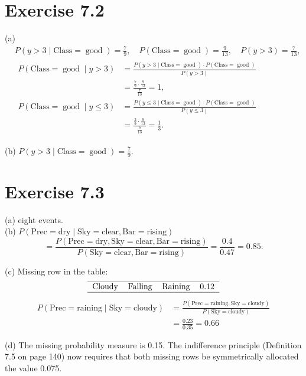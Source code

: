 \documentclass[10pt]{book}
\begin{document}
\section{Exercise 7.2}
(a)
\[
\begin{aligned}
& P(y>3 \mid \text{Class}=\operatorname{good})=\frac{7}{9}, \quad P(\text{Class}=\operatorname{good})=\frac{9}{13}, \quad P(y>3)=\frac{7}{13}, \\
& \begin{aligned}
P(\text{Class}=\operatorname{good} \mid y>3) & =\frac{P(y>3 \mid \text{Class}=\operatorname{good}) \cdot P(\text{Class}=\operatorname{good})}{P(y>3)} \\
& =\frac{\frac{7}{9} \cdot \frac{9}{13}}{\frac{7}{13}}=1, \\
P(\text{Class}=\operatorname{good} \mid y \leq 3) & =\frac{P(y \leq 3 \mid \text{Class}=\operatorname{good}) \cdot P(\text{Class}=\operatorname{good})}{P(y \leq 3)} \\
& =\frac{\frac{2}{9} \cdot \frac{9}{13}}{\frac{6}{13}}=\frac{1}{3}.
\end{aligned}
\end{aligned}
\]

(b) $P(y>3 \mid \text{Class}=\operatorname{good})=\frac{7}{9}$.

\section{Exercise 7.3}
(a) eight events.\\
(b) $P(\text{Prec}=\mathrm{dry} \mid \text{Sky}=\text{clear}, \text{Bar}=\text{rising})$
\[
=\frac{P(\text{Prec}=\text{dry}, \text{Sky}=\text{clear}, \text{Bar}=\text{rising})}{P(\text{Sky}=\text{clear}, \text{Bar}=\text{rising})}=\frac{0.4}{0.47}=0.85.
\]

(c) Missing row in the table:
\[
\begin{tabular}{llll}
\hline
Cloudy & Falling & Raining & 0.12 \\
\hline
\end{tabular}
\]
\[
\begin{aligned}
P(\text{Prec}=\text{raining} \mid \text{Sky}=\text{cloudy}) & =\frac{P(\text{Prec}=\text{raining}, \text{Sky}=\text{cloudy})}{P(\text{Sky}=\text{cloudy})} \\
& =\frac{0.23}{0.35}=0.66
\end{aligned}
\]

(d) The missing probability measure is 0.15. The indifference principle (Definition 7.5 on page 140) now requires that both missing rows be symmetrically allocated the value 0.075.
\end{document}
